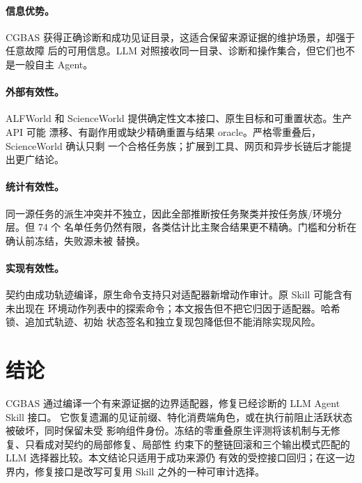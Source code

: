 \documentclass[10pt]{article}
\begin{document}
\paragraph{信息优势。}
CGBAS 获得正确诊断和成功见证目录，这适合保留来源证据的维护场景，却强于任意故障
后的可用信息。LLM 对照接收同一目录、诊断和操作集合，但它们也不是一般自主 Agent。

\paragraph{外部有效性。}
ALFWorld 和 ScienceWorld 提供确定性文本接口、原生目标和可重置状态。生产 API 可能
漂移、有副作用或缺少精确重置与结果 oracle。严格零重叠后，ScienceWorld 确认只剩
一个合格任务族；扩展到工具、网页和异步长链后才能提出更广结论。

\paragraph{统计有效性。}
同一源任务的派生冲突并不独立，因此全部推断按任务聚类并按任务族/环境分层。但 74 个
名单任务仍然有限，各类估计比主聚合结果更不精确。门槛和分析在确认前冻结，失败源未被
替换。

\paragraph{实现有效性。}
契约由成功轨迹编译，原生命令支持只对适配器新增动作审计。原 Skill 可能含有未出现在
环境动作列表中的探索命令；本文报告但不把它归因于适配器。哈希锁、追加式轨迹、初始
状态签名和独立复现包降低但不能消除实现风险。

\section{结论}

CGBAS 通过编译一个有来源证据的边界适配器，修复已经诊断的 LLM Agent Skill 接口。
它恢复遗漏的见证前缀、特化消费端角色，或在执行前阻止活跃状态被破坏，同时保留未受
影响组件身份。冻结的零重叠原生评测将该机制与无修复、只看成对契约的局部修复、局部性
约束下的整链回滚和三个输出模式匹配的 LLM 选择器比较。本文结论只适用于成功来源仍
有效的受控接口回归；在这一边界内，修复接口是改写可复用 Skill 之外的一种可审计选择。



\end{document}

